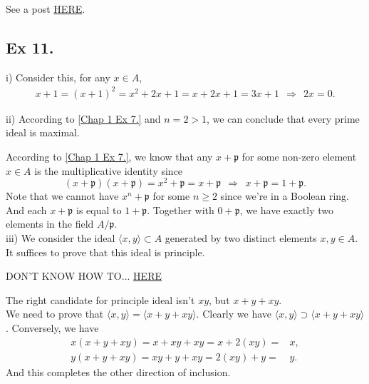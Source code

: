 \subsubsection{}

See a post \href{https://math.stackexchange.com/questions/595552/each-element-of-a-ring-is-either-a-unit-or-a-nilpotent-element-iff-the-ring-has}{HERE}.

\subsection{Ex 11.}

i) Consider this, for any $x\in A$, \begin{align*}
    x+1=(x+1)^2=x^2+2x+1=x+2x+1=3x+1
    ~~\Rightarrow~~ 2x=0.
\end{align*}

\noindent ii) According to \ref{Chap 1 Ex 7.} and $n=2>1$, we can conclude that every prime ideal is maximal.

According to \ref{Chap 1 Ex 7.}, we know that any $x+\mathfrak p$ for some non-zero element $x\in A$ is the multiplicative identity since
$$(x+\mathfrak p)(x+\mathfrak p)=x^2+\mathfrak p=x+\mathfrak p ~~\Rightarrow~~ x+\mathfrak p =1+\mathfrak p.$$
Note that we cannot have $x^n+\mathfrak p$ for some $n\geq 2$ since we're in a Boolean ring. And each $x+\mathfrak p$ is equal to $1+\mathfrak p$.
Together with $0+\mathfrak p$, we have exactly two elements in the field $A/\mathfrak p$.\\

\noindent iii) We consider the ideal $\langle x,y\rangle \subset A$ generated by two distinct elements $x,y\in A$. It suffices to prove that this ideal is principle.

DON'T KNOW HOW TO... \href{https://math.stackexchange.com/questions/110329/finitely-generated-ideals-in-a-boolean-ring-are-principal-why}{HERE}

The right candidate for principle ideal isn't $xy$, but $x+y+xy$.\\

We need to prove that $\langle x,y\rangle =\langle x+y+xy\rangle$. Clearly we have $\langle x,y\rangle \supset \langle x+y+xy\rangle$. Conversely, we have 
\begin{align*}
    x(x+y+xy)=x+xy+xy=x+2(xy)=&x,\\ y(x+y+xy)=xy+y+xy=2(xy)+y=&y.
\end{align*}
And this completes the other direction of inclusion.



